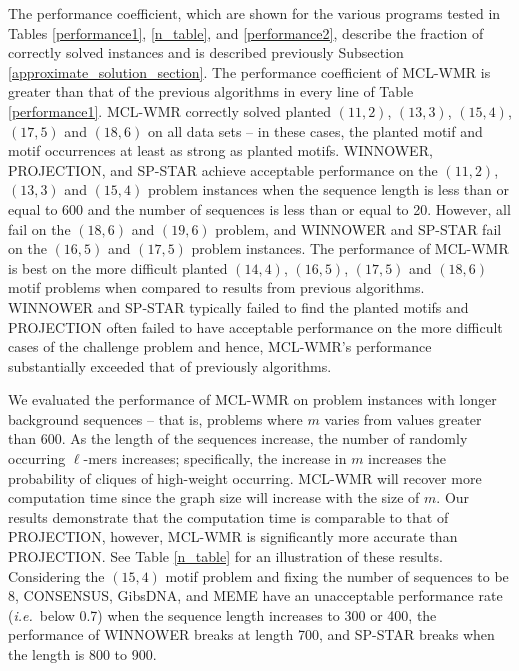The performance coefficient, which are shown for the various programs tested in Tables \ref{performance1}, \ref{n_table}, and \ref{performance2}, describe the fraction of  correctly solved instances and is described previously Subsection \ref{approximate_solution_section}. The performance coefficient of MCL-WMR is greater than that of the previous algorithms in every line of Table \ref{performance1}.  MCL-WMR correctly solved planted $(11,2)$, $(13,3)$, $(15,4)$, $(17,5)$ and $(18,6)$ on all data sets -- in these cases, the planted motif and motif occurrences at least as strong as planted motifs. WINNOWER, PROJECTION, and SP-STAR achieve acceptable performance on the $(11,2)$, $(13,3)$ and $(15,4)$ problem instances when the sequence length is less than or equal to 600 and the number of sequences is less than or equal to 20. However, all fail on the $(18,6)$ and $(19,6)$ problem, and WINNOWER and SP-STAR fail on the $(16,5)$ and $(17,5)$ problem instances.  The performance of MCL-WMR is best on the more difficult planted $(14,4)$, $(16,5)$, $(17,5)$ and $(18,6)$ motif problems when compared to results from previous algorithms.  WINNOWER and SP-STAR typically failed to find the planted motifs and PROJECTION often failed to have acceptable performance on the more difficult cases of the challenge problem \cite{BT02} and hence, MCL-WMR's performance substantially exceeded that of previously algorithms. 

We evaluated the performance of MCL-WMR on problem instances with longer background sequences -- that is, problems where $m$ varies from values greater than 600. As the length of the sequences increase, the number of randomly occurring $\ell$-mers increases; specifically, the increase in $m$ increases the probability of cliques of high-weight occurring. MCL-WMR will recover more computation time since the graph size will increase with the size of $m$.  Our results demonstrate that the computation time is comparable to that of PROJECTION, however, MCL-WMR is significantly more accurate than PROJECTION.  See Table \ref{n_table} for an illustration of these results.  Considering the $(15,4)$ motif problem and fixing the number of sequences to be 8, CONSENSUS, GibsDNA, and MEME have an unacceptable performance rate ({\em i.e.}\ below 0.7) when the sequence length increases to 300 or 400, the performance of WINNOWER breaks at length 700, and SP-STAR breaks when the length is 800 to 900. 
 
